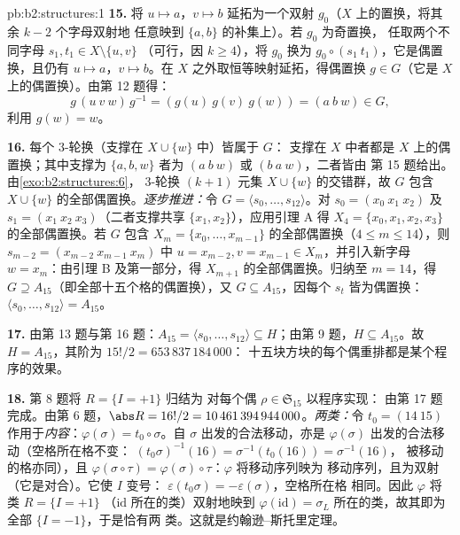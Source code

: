 \begin{solution}{pb:b2:structures:1}
\textbf{15.} 将 $u \mapsto a$，$v \mapsto b$ 延拓为一个双射
$g_0$（$X$ 上的置换，将其余 $k - 2$ 个字母双射地
任意映到 $\{a, b\}$ 的补集上）。若 $g_0$ 为奇置换，
任取两个不同字母 $s_1, t_1 \in X \setminus \{u, v\}$
（可行，因 $k \geq 4$），将 $g_0$ 换为 $g_0 \circ (s_1\
t_1)$，它是偶置换，且仍有 $u \mapsto a$，$v \mapsto
b$。在 $X$ 之外取恒等映射延拓，得偶置换 $g \in
G$（它是 $X$ 上的偶置换）。由第 12 题得：
\[
g\,(u\ v\ w)\,g^{-1} = (g(u)\ g(v)\ g(w)) = (a\ b\ w) \in G,
\]
利用 $g(w) = w$。

\textbf{16.} 每个 $3$-轮换（支撑在 $X \cup \{w\}$ 中）皆属于 $G$：
支撑在 $X$ 中者都是 $X$ 上的偶置换；其中支撑为
$\{a, b, w\}$ 者为 $(a\ b\ w)$ 或 $(b\ a\ w)$，二者皆由
第 15 题给出。由\cref{exo:b2:structures:6}，
$3$-轮换 $(k+1)$ 元集 $X \cup \{w\}$
的交错群，故 $G$ 包含
$X \cup \{w\}$ 的全部偶置换。\emph{逐步推进：}令 $G = \langle s_0, \dots,
s_{12}\rangle$。对 $s_0 = (x_0\ x_1\ x_2)$ 及
$s_1 = (x_1\ x_2\ x_3)$（二者支撑共享 $\{x_1, x_2\}$），应用引理 A 得
$X_4 = \{x_0, x_1, x_2, x_3\}$ 的全部偶置换。若 $G$
包含 $X_m = \{x_0, \dots,
x_{m-1}\}$ 的全部偶置换（$4 \leq m \leq 14$），则 $s_{m-2} = (x_{m-2}\
x_{m-1}\ x_m)$ 中 $u = x_{m-2}, v = x_{m-1} \in X_m$，并引入新字母
$w = x_m$：由引理 B 及第一部分，得
$X_{m+1}$ 的全部偶置换。归纳至 $m = 14$，得 $G \supseteq
A_{15}$（即全部十五个格的偶置换），又 $G
\subseteq A_{15}$，因每个 $s_t$ 皆为偶置换：$\langle s_0, \dots,
s_{12}\rangle = A_{15}$。

\textbf{17.} 由第 13 题与第 16 题：$A_{15} = \langle s_0, \dots,
s_{12}\rangle \subseteq H$；由第 9 题，$H \subseteq A_{15}$。故
$H = A_{15}$，其阶为 $15!/2 = 653\,837\,184\,000$：
十五块方块的每个偶重排都是某个程序的效果。

\textbf{18.} 第 8 题将 $R = \{I = +1\}$ 归结为
对每个偶 $\rho \in \mathfrak{S}_{15}$ 以程序实现：
由第 17 题完成。由第 6 题，$\abs R = 16!/2 =
10\,461\,394\,944\,000$。\emph{两类：}令 $t_0 = (14\
15)$ 作用于\emph{内容}：$\varphi(\sigma) = t_0 \circ
\sigma$。自 $\sigma$ 出发的合法移动，亦是
$\varphi(\sigma)$ 出发的合法移动（空格所在格不变：
$(t_0\sigma)^{-1}(16) = \sigma^{-1}(t_0(16)) = \sigma^{-1}(16)$，
被移动的格亦同），且 $\varphi(\sigma \circ \tau)
= \varphi(\sigma) \circ \tau$：$\varphi$ 将移动序列映为
移动序列，且为双射（它是对合）。它使 $I$ 变号：
$\varepsilon(t_0\sigma) = -\varepsilon(\sigma)$，空格所在格
相同。因此 $\varphi$ 将类 $R = \{I = +1\}$
（$\mathrm{id}$ 所在的类）双射地映到 $\varphi(\mathrm{id})
= \sigma_L$ 所在的类，故其即为全部 $\{I = -1\}$，于是恰有两
类。这就是约翰逊--斯托里定理。


\end{solution}
